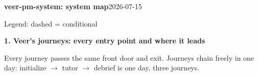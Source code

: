 \documentclass[11pt]{article}
\begin{document}
{\Large\bfseries veer-pm-system: system map}\hfill{\small 2026-07-15}

\vspace{2mm}
Legend:\quad
{}\quad
{}\quad
{}\quad
{}\quad
{}\quad
dashed = conditional

\newpage
{\large\bfseries 1. Veer's journeys: every entry point and where it leads}

\vspace{1mm}
Every journey passes the same front door and exit. Journeys chain freely in one day: initialize $\to$ tutor $\to$ debrief is one day, three journeys.
\end{document}
